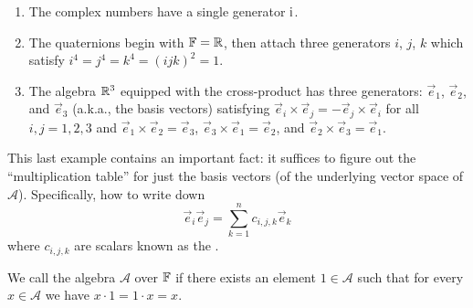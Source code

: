 \begin{example}
  \begin{enumerate}
  \item The complex numbers have a single generator $\mathrm{i}$.
  \item The quaternions begin with $\mathbb{F}=\mathbb{R}$, then attach three generators $i$,
$j$, $k$ which satisfy $i^{4}=j^{4}=k^{4}=(ijk)^{2}=1$.
  \item The algebra $\mathbb{R}^{3}$ equipped with the cross-product has three
    generators: $\vec{e}_{1}$, $\vec{e}_{2}$, and $\vec{e}_{3}$ (a.k.a.,
    the basis vectors) satisfying
    $\vec{e}_{i}\times\vec{e}_{j}=-\vec{e}_{j}\times \vec{e}_{i}$ for
    all $i,j=1,2,3$ and
    $\vec{e}_{1}\times\vec{e}_{2}=\vec{e}_{3}$,
    $\vec{e}_{3}\times\vec{e}_{1}=\vec{e}_{2}$, and
    $\vec{e}_{2}\times\vec{e}_{3}=\vec{e}_{1}$.
  \end{enumerate}
  This last example contains an important fact: it suffices to figure
  out the ``multiplication table'' for just the basis vectors (of the
  underlying vector space of $\mathcal{A}$). Specifically, how to write
  down
\begin{equation}
\vec{e}_{i}\vec{e}_{j} = \sum_{k=1}^{n}c_{i,j,k}\vec{e}_{k}
\end{equation}
where $c_{i,j,k}$ are scalars known as the .
\end{example}

\begin{definition}
We call the algebra $\mathcal{A}$ over $\mathbb{F}$  if there
exists an element $1\in\mathcal{A}$ such that for every
$x\in\mathcal{A}$ we have $x\cdot1=1\cdot x=x$.
\end{definition}
